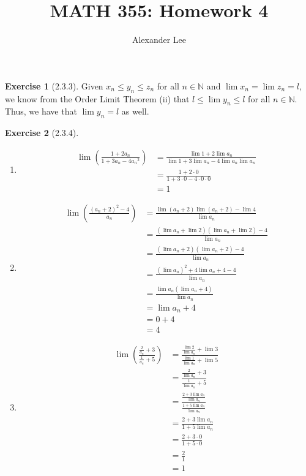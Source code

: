\documentclass{amsart}
\title{MATH 355: Homework 4}
\author{Alexander Lee}
\theoremstyle{definition}
\newtheorem{exercise}{Exercise}
\newcommand{\N}{\mathbb{N}}
\begin{document}
\maketitle

\begin{exercise}[2.3.3]
  Given $x_n \le y_n \le z_n$ for all $n \in \N$ and $\lim{x_n} = \lim{z_n} =
  l$, we know from the Order Limit Theorem (ii) that $l \le \lim{y_n} \le l$
  for all $n \in \N$. Thus, we have that $\lim{y_n} = l$ as well.
\end{exercise}

\begin{exercise}[2.3.4]
  \begin{enumerate}[label={(\alph*)}]
    \item
      \begin{align*}
        \lim\left(\frac{1 + 2a_n}{1 + 3a_n - 4{a_n}^2}\right) &= \frac{\lim{1} +
        2 \lim{a_n}}{\lim{1} + 3 \lim{a_n} - 4 \lim{a_n} \lim{a_n}} \\
        &= \frac{1 + 2 \cdot 0}{ 1 + 3 \cdot 0 - 4 \cdot 0 \cdot 0} \\
        &= 1
      \end{align*}
    \item
      \begin{align*}
        \lim\left(\frac{{(a_n + 2)}^2 - 4}{a_n}\right) &= \frac{\lim(a_n + 2)
        \lim(a_n + 2) - \lim{4}}{\lim{a_n}} \\
        &= \frac{(\lim{a_n} + \lim{2}) (\lim{a_n} + \lim{2}) - 4}{\lim{a_n}} \\
        &= \frac{(\lim{a_n} + 2) (\lim{a_n} + 2) - 4}{\lim{a_n}} \\
        &= \frac{{(\lim{a_n})}^2 + 4 \lim{a_n} + 4 - 4}{\lim{a_n}} \\
        &= \frac{\lim{a_n} (\lim{a_n} + 4)}{\lim{a_n}} \\
        &= \lim{a_n} + 4 \\
        &= 0 + 4 \\
        &= 4
      \end{align*}
    \item
      \begin{align*}
        \lim\left(\frac{\frac{2}{a_n} + 3}{\frac{1}{a_n} + 5}\right) &=
        \frac{\frac{\lim{2}}{\lim{a_n}} + \lim{3}}{\frac{\lim{1}}{\lim{a_n}} +
        \lim{5}} \\
        &= \frac{\frac{2}{\lim{a_n}} + 3}{\frac{1}{\lim{a_n}} + 5} \\
        &= \frac{\frac{2 + 3 \lim{a_n}}{\lim{a_n}}}{\frac{1 + 5
        \lim{a_n}}{\lim{a_n}}} \\
        &= \frac{2 + 3 \lim{a_n}}{1 + 5 \lim{a_n}} \\
        &= \frac{2 + 3 \cdot 0}{1 + 5 \cdot 0} \\
        &= \frac{2}{1} \\
        &= 1
      \end{align*}
  \end{enumerate}
\end{exercise}
\end{document}
